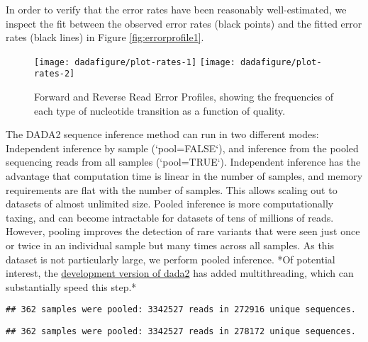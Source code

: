 In order to verify that the error rates have been reasonably
well-estimated, we inspect the fit between the observed error rates (black
points) and the fitted error rates (black lines) in Figure \ref{fig:errorprofile1}.


\begin{knitrout}
\color{fgcolor}\begin{kframe}
\begin{alltt}
\end{alltt}
\end{kframe}
\end{knitrout}
\begin{figure}
\texttt{[image: dadafigure/plot-rates-1]}
\texttt{[image: dadafigure/plot-rates-2]}
\caption{Forward and Reverse Read Error Profiles, showing the
  frequencies of each type of nucleotide transition as a function of quality.}\label{fig:r
  errorprofile1}
\end{figure}

The DADA2 sequence inference method can run in two different modes:
Independent inference by sample (`pool=FALSE`), and inference from the
pooled sequencing reads from all samples (`pool=TRUE`). Independent
inference has the advantage that computation time is linear
in the number of samples, and memory requirements are flat with the
number of samples. This allows scaling out to datasets of almost unlimited
size. Pooled inference is more computationally taxing, and can become
intractable for datasets of tens of millions of reads.
However, pooling improves the detection of rare variants that
were seen just once or twice in an individual sample but many times across
all samples. As this dataset is not particularly large, we perform pooled
inference. *Of potential interest, the
\href{https://github.com/benjjneb/dada2}{development version of dada2}
has added multithreading, which can substantially speed this step.*

\begin{knitrout}
\color{fgcolor}\begin{kframe}
\begin{alltt}
 \hlkwb{<-}  \hlstd{=ddF[[}\hlstd{]]}\hlopt{$} \hlstd{=}\hlstd{)}
\end{alltt}
\begin{verbatim}
## 362 samples were pooled: 3342527 reads in 272916 unique sequences.
\end{verbatim}
\begin{alltt}
 \hlkwb{<-}  \hlstd{=ddR[[}\hlstd{]]}\hlopt{$} \hlstd{=}\hlstd{)}
\end{alltt}
\begin{verbatim}
## 362 samples were pooled: 3342527 reads in 278172 unique sequences.
\end{verbatim}
\end{kframe}
\end{knitrout}

